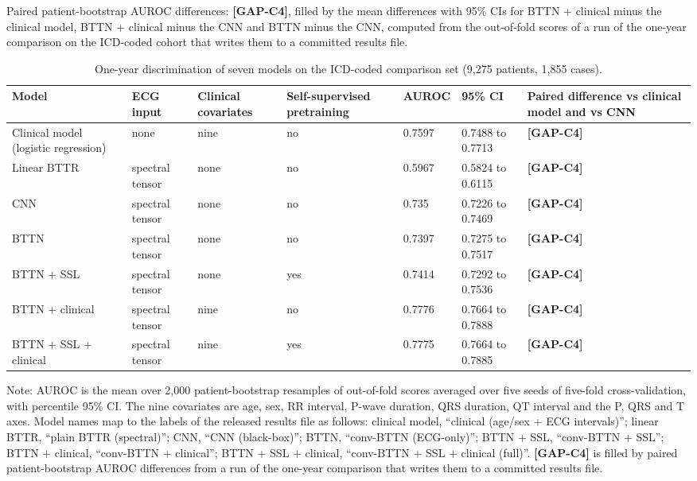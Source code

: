 \documentclass[preprint,12pt]{elsarticle}
\begin{document}
Paired patient-bootstrap AUROC differences: \textbf{[GAP-C4]}, filled by the mean differences with 95\% CIs for BTTN + clinical minus the clinical model, BTTN + clinical minus the CNN and BTTN minus the CNN, computed from the out-of-fold scores of a run of the one-year comparison on the ICD-coded cohort that writes them to a committed results file.

\begin{table}[htbp]
\centering
\footnotesize
\caption{One-year discrimination of seven models on the ICD-coded comparison set (9,275 patients, 1,855 cases).}
\label{tab:oneyear}
\begin{tabularx}{\textwidth}{@{}L{0.2\textwidth}YYYYYY@{}}
\toprule
Model & ECG input & Clinical covariates & Self-supervised pretraining & AUROC & 95\% CI & Paired difference vs clinical model and vs CNN \\
\midrule
Clinical model (logistic regression) & none & nine & no & 0.7597 & 0.7488 to 0.7713 & \textbf{[GAP-C4]} \\
Linear BTTR & spectral tensor & none & no & 0.5967 & 0.5824 to 0.6115 & \textbf{[GAP-C4]} \\
CNN & spectral tensor & none & no & 0.735 & 0.7226 to 0.7469 & \textbf{[GAP-C4]} \\
BTTN & spectral tensor & none & no & 0.7397 & 0.7275 to 0.7517 & \textbf{[GAP-C4]} \\
BTTN + SSL & spectral tensor & none & yes & 0.7414 & 0.7292 to 0.7536 & \textbf{[GAP-C4]} \\
BTTN + clinical & spectral tensor & nine & no & 0.7776 & 0.7664 to 0.7888 & \textbf{[GAP-C4]} \\
BTTN + SSL + clinical & spectral tensor & nine & yes & 0.7775 & 0.7664 to 0.7885 & \textbf{[GAP-C4]} \\
\bottomrule
\end{tabularx}

\smallskip
\raggedright
Note: AUROC is the mean over 2,000 patient-bootstrap resamples of out-of-fold scores averaged over five seeds of five-fold cross-validation, with percentile 95\% CI. The nine covariates are age, sex, RR interval, P-wave duration, QRS duration, QT interval and the P, QRS and T axes. Model names map to the labels of the released results file as follows: clinical model, ``clinical (age/sex + ECG intervals)''; linear BTTR, ``plain BTTR (spectral)''; CNN, ``CNN (black-box)''; BTTN, ``conv-BTTN (ECG-only)''; BTTN + SSL, ``conv-BTTN + SSL''; BTTN + clinical, ``conv-BTTN + clinical''; BTTN + SSL + clinical, ``conv-BTTN + SSL + clinical (full)''. \textbf{[GAP-C4]} is filled by paired patient-bootstrap AUROC differences from a run of the one-year comparison that writes them to a committed results file.
\end{table}
\end{document}
